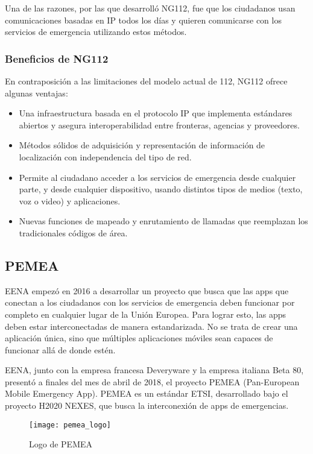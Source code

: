 Una de las razones, por las que desarrolló NG112, fue que los ciudadanos usan comunicaciones basadas en IP todos los días y quieren comunicarse con los servicios de emergencia utilizando estos métodos.

\subsubsection{Beneficios de NG112}

En contraposición a las limitaciones del modelo actual de 112, NG112 ofrece algunas ventajas:

\begin{itemize}
  \item Una infraestructura basada en el protocolo IP que implementa estándares abiertos y asegura interoperabilidad entre fronteras, agencias y proveedores.
  \item Métodos sólidos de adquisición y representación de información de localización con independencia del tipo de red.
  \item Permite al ciudadano acceder a los servicios de emergencia desde cualquier parte, y desde cualquier dispositivo, usando distintos tipos de medios (texto, voz o video) y aplicaciones.
  \item Nuevas funciones de mapeado y enrutamiento de llamadas que reemplazan los tradicionales códigos de área.
\end{itemize}

\subsection{PEMEA}

EENA empezó en 2016 a desarrollar un proyecto que busca que las apps que conectan a los ciudadanos con los servicios de emergencia deben funcionar por completo en cualquier lugar de la Unión Europea. Para lograr esto, las apps deben estar interconectadas de manera estandarizada. No se trata de crear una aplicación única, sino que múltiples aplicaciones móviles sean capaces de funcionar allá de donde estén.

EENA, junto con la empresa francesa Deveryware y la empresa italiana Beta 80, presentó a finales del mes de abril de 2018, el proyecto PEMEA (Pan-European Mobile Emergency App). PEMEA es un estándar ETSI, desarrollado bajo el proyecto H2020 NEXES, que busca la interconexión de apps de emergencias.

\begin{figure}[htp!]
  \centering
  \texttt{[image: pemea\_logo]}
  \caption{Logo de PEMEA}
  \label{fig:pemea_logo}
\end{figure}

